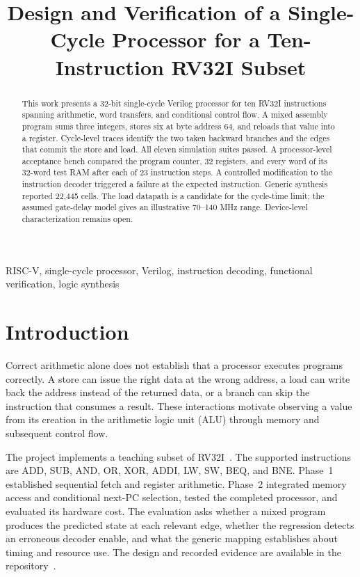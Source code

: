 \documentclass[conference,letterpaper]{IEEEtran}
\begin{document}
\title{Design and Verification of a Single-Cycle Processor for a Ten-Instruction RV32I Subset}
\author{
}
\maketitle
\thispagestyle{plain}\pagestyle{plain}
\begin{abstract}
This work presents a 32-bit single-cycle Verilog processor for ten RV32I instructions spanning arithmetic, word transfers, and conditional control flow. A mixed assembly program sums three integers, stores six at byte address 64, and reloads that value into a register. Cycle-level traces identify the two taken backward branches and the edges that commit the store and load. All eleven simulation suites passed. A processor-level acceptance bench compared the program counter, 32 registers, and every word of its 32-word test RAM after each of 23 instruction steps. A controlled modification to the instruction decoder triggered a failure at the expected instruction. Generic synthesis reported 22,445 cells. The load datapath is a candidate for the cycle-time limit; the assumed gate-delay model gives an illustrative 70--140 MHz range. Device-level characterization remains open.
\end{abstract}
\begin{IEEEkeywords}
RISC-V, single-cycle processor, Verilog, instruction decoding, functional verification, logic synthesis
\end{IEEEkeywords}
\section{Introduction}
Correct arithmetic alone does not establish that a processor executes programs correctly. A store can issue the right data at the wrong address, a load can write back the address instead of the returned data, or a branch can skip the instruction that consumes a result. These interactions motivate observing a value from its creation in the arithmetic logic unit (ALU) through memory and subsequent control flow.

The project implements a teaching subset of RV32I~\cite{isa}. The supported instructions are ADD, SUB, AND, OR, XOR, ADDI, LW, SW, BEQ, and BNE. Phase~1 established sequential fetch and register arithmetic. Phase~2 integrated memory access and conditional next-PC selection, tested the completed processor, and evaluated its hardware cost. The evaluation asks whether a mixed program produces the predicted state at each relevant edge, whether the regression detects an erroneous decoder enable, and what the generic mapping establishes about timing and resource use. The design and recorded evidence are available in the repository~\cite{project}.
\end{document}
